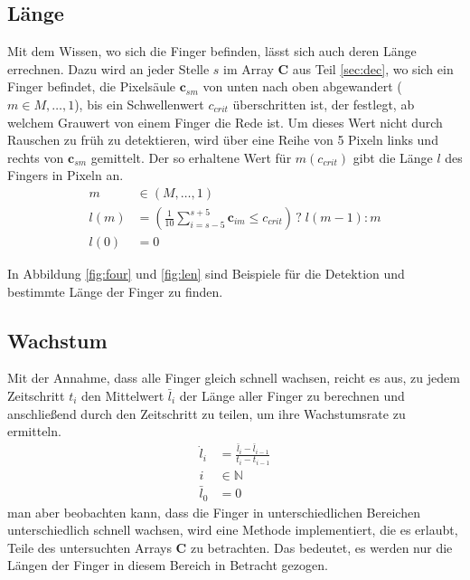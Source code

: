 \subsection{Länge}
\label{sec:lan}
Mit dem Wissen, wo sich die Finger befinden, lässt sich auch deren Länge errechnen. Dazu wird an jeder Stelle $s$ im Array $\mathbf{C}$ aus Teil \ref{sec:dec}, 
wo sich ein Finger befindet, die Pixelsäule $\mathbf{c}_{sm}$ von unten nach oben abgewandert ($m \in M, \dots, 1$), bis ein Schwellenwert $c_{crit}$ 
überschritten ist, der festlegt, ab welchem Grauwert von einem Finger die Rede ist. Um dieses Wert nicht durch Rauschen zu früh zu detektieren, wird über eine 
Reihe von 5 Pixeln links und rechts von $\mathbf{c}_{sm}$ gemittelt. Der so erhaltene Wert für $m(c_{crit})$ gibt die Länge $l$ des Fingers in Pixeln an.
\begin{align}
 m &\in (M,\dots,1) \\
 l(m) &= \left(\frac{1}{10}\sum_{i=s-5}^{s+5} \mathbf{c}_{im} \leq c_{crit} \right) \, ? \; l(m-1) : m \\
 l(0) &= 0
\end{align}

In Abbildung \ref{fig:four} und \ref{fig:len} sind Beispiele für die Detektion und bestimmte Länge der Finger zu finden.

\subsection{Wachstum}
\label{sec:grow}
Mit der Annahme, dass alle Finger gleich schnell wachsen, reicht es aus, zu jedem Zeitschritt $t_i$ den Mittelwert $\bar{l}_i$ der Länge aller Finger zu 
berechnen und anschließend durch den Zeitschritt zu teilen, um ihre Wachstumsrate zu ermitteln. 
\begin{align}
 \dot{l}_i &= \frac{\bar{l}_i-\bar{l}_{i-1}}{t_i-t_{i-1}} \\
 i &\in \mathbb{N} \\
 \bar{l}_{0} &= 0
\end{align}
man aber beobachten kann, dass die Finger in unterschiedlichen Bereichen unterschiedlich schnell wachsen, wird eine Methode implementiert, die es erlaubt, Teile 
des untersuchten Arrays $\mathbf{C}$ zu betrachten. Das bedeutet, es werden nur die Längen der Finger in diesem Bereich in Betracht gezogen. 